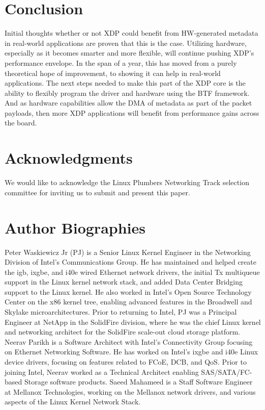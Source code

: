 \documentclass[letterpaper]{article}
\begin{document}
\section{Conclusion}
Initial thoughts whether or not XDP could benefit from HW-generated metadata in real-world applications are proven that this is the case.  Utilizing hardware, especially as it becomes smarter and more flexible, will continue pushing XDP’s performance envelope.  In the span of a year, this has moved from a purely theoretical hope of improvement, to showing it can help in real-world applications.  The next steps needed to make this part of the XDP core is the ability to flexibly program the driver and hardware using the BTF framework.  And as hardware capabilities allow the DMA of metadata as part of the packet payloads, then more XDP applications will benefit from performance gains across the board.

\section{Acknowledgments}
We would like to acknowledge the Linux Plumbers Networking Track selection committee for inviting us to submit and present this paper.




\section{Author Biographies}
Peter Waskiewicz Jr (PJ) is a Senior Linux Kernel Engineer in the Networking Division of Intel's Communications Group. He has maintained and helped create the igb, ixgbe, and i40e wired Ethernet network drivers, the initial Tx multiqueue support in the Linux kernel network stack, and added Data Center Bridging support to the Linux kernel. He also worked in Intel's Open Source Technology Center on the x86 kernel tree, enabling advanced features in the Broadwell and Skylake microarchitectures. Prior to returning to Intel, PJ was a Principal Engineer at NetApp in the SolidFire division, where he was the chief Linux kernel and networking architect for the SolidFire scale-out cloud storage platform.
\newline
\newline
Neerav Parikh is a Software Architect with Intel's Connectivity Group focusing on Ethernet Networking Software. He has worked on Intel's ixgbe and i40e Linux device drivers, focusing on features related to FCoE, DCB, and QoS. Prior to joining Intel, Neerav worked as a Technical Architect enabling SAS/SATA/FC-based Storage software products.
\newline
\newline
Saeed Mahameed is a Staff Software Engineer at Mellanox Technologies, working on the Mellanox network drivers, and various aspects of the Linux Kernel Network Stack.
\end{document}
